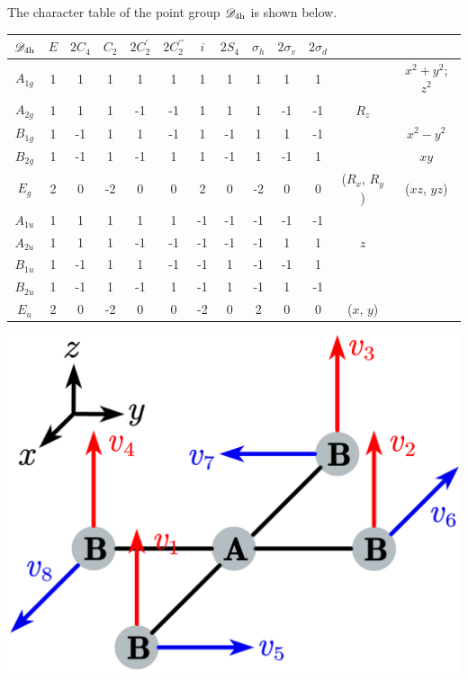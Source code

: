 \documentclass[a4paper]{book}
\begin{document}
	\begin{solution}
		
		The character table of the point group $\mathscr{D}_{\rm 4h}$ is shown below.
		\begin{center}
		\begin{tabular}{ccccccccccccc}\hline
	$\mathscr{D}_{\rm 4h}$ & $E$ & $2C_4$ &	$C_2$	& $2C^\prime_2$	&	$2C^{\prime\prime}_2$	&	$i$	&	$2S_4$	&	$\sigma_{h}$	&	$2\sigma_{v}$ &	$2\sigma_{d}$	&		&\\ \hline
			$A_{1g}$	&	1	&	1	&	1	&	1	&	1	&	1	&	1	&	1	&	1	&	1	&		&	$x^2+y^2$; $z^2$\\
			$A_{2g}$	&	1	&	1	&	1	&	-1	&	-1	&	1	&	1	&	1	&	-1	&	-1	& $R_z$	&	\\
			$B_{1g}$	&	1	&	-1	&	1	&	1	&	-1	&	1	&	-1	&	1	&	1	&	-1	&		&	$x^2-y^2$\\
			$B_{2g}$ 	&	1	&	-1	&	1	&	-1	&	1	&	1	&	-1	&	1	&	-1	&	1	&		&	$xy$	\\
			$E_g$ 		&	2	&	0	&	-2	&	0	&	0	&	2	&	0	&	-2	&	0	&	0	& ($R_x$, $R_y$) & ($xz$, $yz$)\\ 
			$A_{1u}$	&	1	&	1	&	1	&	1	&	1	&	-1	&	-1	&	-1	&	-1	&	-1	&		&	\\
			$A_{2u}$	&	1	&	1	&	1	&	-1	&	-1	&	-1	&	-1	&	-1	&	1	&	1	&	$z$	&	\\
			$B_{1u}$	&	1	&	-1	&	1	&	1	&	-1	&	-1	&	1	&	-1	&	-1	&	1	&		&	\\
			$B_{2u}$ 	&	1	&	-1	&	1	&	-1	&	1	&	-1	&	1	&	-1	&	1	&	-1	&		&	\\
			$E_u$ 		&	2	&	0	&	-2	&	0	&	0	&	-2	&	0	&	2	&	0	&	0	& ($x$, $y$)	&\\ \hline
		\end{tabular}
		\end{center}
		
		\begin{minipage}[t]{1.0\linewidth}
		\begin{center}
		\setlength{\abovecaptionskip}{0.5em}
		\includegraphics[scale=1.5]{./structures/exercise_3/square_planar.png}
		\end{center}
		\end{minipage}	
		

\end{solution}
\end{document}
